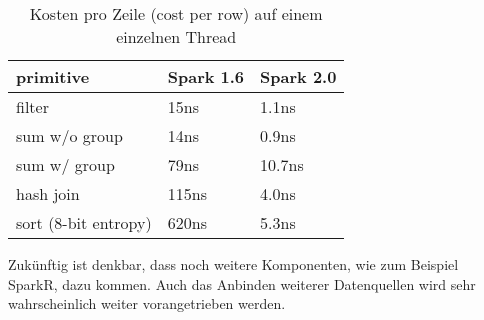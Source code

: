 \begin{table}[h]
  \centering
		
		  \begin{tabular}[t]{|l|l|l|}
    \hline
		
		\rowcolor[gray]{.9}
		
				primitive	 & Spark 1.6 &  Spark 2.0 \\ \hline				
				filter &	15ns &	1.1ns \\ \hline				
				sum w/o group &	14ns &	0.9ns \\ \hline				
				sum w/ group &	79ns &	10.7ns \\ \hline				
				hash join	& 115ns	& 4.0ns \\ \hline				
				sort (8-bit entropy)	& 620ns	 & 5.3ns \\ \hline				

  \end{tabular}
		
  \caption{Kosten pro Zeile (cost per row) auf einem einzelnen Thread}\label{tab:spark_2_0}
\end{table}



\noindent
Zukünftig ist denkbar, dass noch weitere Komponenten, wie zum Beispiel SparkR, dazu kommen. Auch das Anbinden weiterer Datenquellen wird sehr wahrscheinlich weiter vorangetrieben werden.